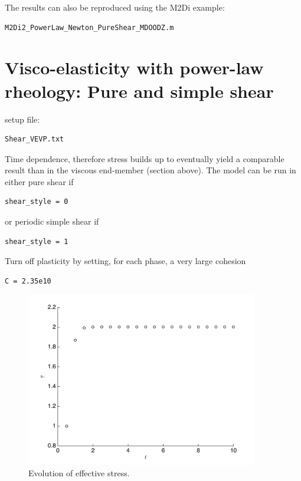 \documentclass[12pt,english,openany]{scrbook}
\begin{document}
The results can also be reproduced using the M2Di example:
\begin{verbatim} 
M2Di2_PowerLaw_Newton_PureShear_MDOODZ.m
\end{verbatim}

\section{Visco-elasticity with power-law rheology: Pure and simple shear}


setup file:
\begin{verbatim} 
Shear_VEVP.txt
\end{verbatim}

Time dependence, therefore stress builds up to eventually yield a comparable result than in the viscous end-member (section above).
The model can be run in either pure shear if 
\begin{verbatim} 
shear_style = 0
\end{verbatim}

or periodic simple shear if 
\begin{verbatim} 
shear_style = 1
\end{verbatim}

Turn off plasticity by setting, for each phase, a very large cohesion
\begin{verbatim} 
C = 2.35e10
\end{verbatim}

\begin{figure}[ht!]
\centerline{\includegraphics[height=3.0in]{./Figures/PureShear_pwl_VE_evol}}
\caption{Evolution of effective stress.}
\label{PureShear_pwl_VE_evol}
\end{figure}
\end{document}
